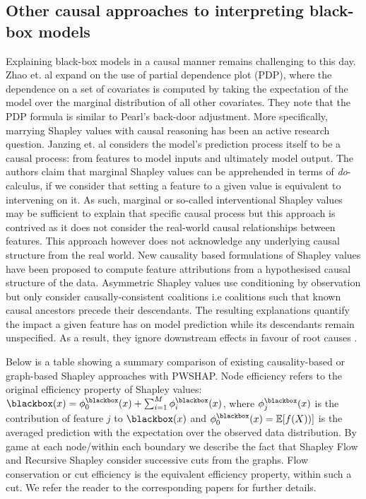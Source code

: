 \subsection{Other causal approaches to interpreting black-box models} 
\label{subsec:further_causal}
Explaining black-box models in a causal manner remains challenging to this day. Zhao et. al  expand on the use of partial dependence plot (PDP), where the dependence on a set of covariates is computed by taking the expectation of the model over the marginal distribution of all other covariates. They note that the PDP formula is similar to Pearl’s back-door adjustment. More specifically, marrying Shapley values with causal reasoning has been an active research question. Janzing et. al  considers the model’s prediction process itself to be a causal process: from features to model inputs and ultimately model output. The authors claim that marginal Shapley values can be apprehended in terms of \textit{do}-calculus, if we consider that setting a feature to a given value is equivalent to intervening on it. As such, marginal or so-called interventional Shapley values may be sufficient to explain that specific causal process but this approach is contrived as it does not consider the real-world causal relationships between features. This approach however does not acknowledge any underlying causal structure from the real world. New causality based formulations of Shapley values have been proposed to compute feature attributions from a hypothesised causal structure of the data. Asymmetric Shapley values  use conditioning by observation but only consider causally-consistent coalitions i.e coalitions such that known causal ancestors precede their descendants. The resulting explanations quantify the impact a given feature has on model prediction while its descendants remain unspecified. As a result, they ignore downstream effects in favour of root causes . 

Below is a table showing a summary comparison of existing causality-based or graph-based Shapley approaches with PWSHAP.
Node efficiency refers to the original efficiency property of Shapley values: $\blackbox(x)=\phi^{\blackbox}_{0}(x)+\sum_{i=1}^{M} \phi^{\blackbox}_{i}(x)$, where $\phi^{\blackbox}_{j}(x)$ is the contribution of feature $j$ to $\blackbox(x)$ and $\phi^{\blackbox}_{0}(x)=\mathbb{E} [f(X))]$ is the averaged prediction with the expectation over the observed data distribution. By game at each node/within each boundary we describe the fact that Shapley Flow and Recursive Shapley consider successive cuts from the graphs. Flow conservation or cut efficiency is the equivalent efficiency property, within such a cut. We refer the reader to the corresponding papers for further details. 


